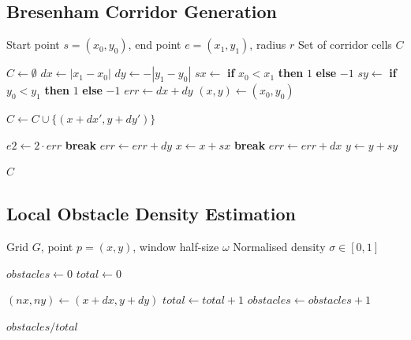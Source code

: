 \documentclass[11pt]{article}
\begin{document}
\subsection{Bresenham Corridor Generation}

\begin{algorithm}[H]
\caption{Bresenham Corridor Generation}
\label{alg:bresenham_corridor}
\begin{algorithmic}[1]
\REQUIRE Start point $s = (x_0, y_0)$, end point $e = (x_1, y_1)$, radius $r$
\ENSURE Set of corridor cells $C$

\STATE $C \gets \emptyset$
\STATE $dx \gets |x_1 - x_0|$
\STATE $dy \gets -|y_1 - y_0|$
\STATE $sx \gets$ \textbf{if} $x_0 < x_1$ \textbf{then} $1$ \textbf{else} $-1$
\STATE $sy \gets$ \textbf{if} $y_0 < y_1$ \textbf{then} $1$ \textbf{else} $-1$
\STATE $err \gets dx + dy$
\STATE $(x, y) \gets (x_0, y_0)$

        \STATE $C \gets C \cup \{(x + dx', y + dy')\}$
    \ENDFOR

    \STATE $e2 \gets 2 \cdot err$
         \textbf{break} \ENDIF
        \STATE $err \gets err + dy$
        \STATE $x \gets x + sx$
    \ENDIF
         \textbf{break} \ENDIF
        \STATE $err \gets err + dx$
        \STATE $y \gets y + sy$
    \ENDIF
\ENDWHILE

\RETURN $C$
\end{algorithmic}
\end{algorithm}

\subsection{Local Obstacle Density Estimation}

\begin{algorithm}[H]
\caption{Local Obstacle Density Estimation}
\label{alg:density}
\begin{algorithmic}[1]
\REQUIRE Grid $G$, point $p = (x, y)$, window half-size $\omega$
\ENSURE Normalised density $\sigma \in [0, 1]$

\STATE $obstacles \gets 0$
\STATE $total \gets 0$

        \STATE $(nx, ny) \gets (x + dx, y + dy)$
            \STATE $total \gets total + 1$
                \STATE $obstacles \gets obstacles + 1$
            \ENDIF
        \ENDIF
    \ENDFOR
\ENDFOR

\RETURN $obstacles / total$ 
\end{algorithmic}
\end{algorithm}
\end{document}
